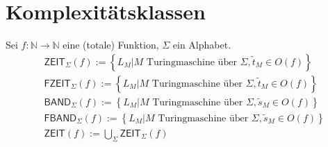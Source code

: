 \documentclass[10pt,oneside,a4paper]{scrartcl}
\begin{document}
\section{Komplexitätsklassen}
    Sei $f : \mathbb{N}\longrightarrow\mathbb{N}$ eine (totale) Funktion,
    $\Sigma$ ein Alphabet.
    \begin{align}
    &\textsf{ZEIT}_{\Sigma}(f) := \left\{
        L_M | M \text{ Turingmaschine über }
        \Sigma, \tilde{t}_M \in O(f)\right\}\\
    &\textsf{FZEIT}_{\Sigma}(f) := \left\{
        L_M | M \text{ Turingmaschine über }
        \Sigma, \tilde{t}_M \in O(f)\right\}\\
    &\textsf{BAND}_{\Sigma}(f) := \left\{
        L_M | M \text{ Turingmaschine über }
        \Sigma, \tilde{s}_M \in O(f)\right\}\\
    &\textsf{FBAND}_{\Sigma}(f) := \left\{
        L_M | M \text{ Turingmaschine über }
        \Sigma, \tilde{s}_M \in O(f)\right\}\\
    &\textsf{ZEIT}(f) := \bigcup_{\Sigma}{\textsf{ZEIT}_{\Sigma}(f)}
    \end{align}
\end{document}
